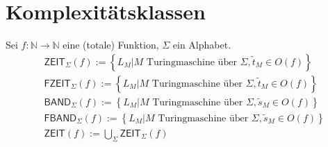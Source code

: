 \documentclass[10pt,oneside,a4paper]{scrartcl}
\begin{document}
\section{Komplexitätsklassen}
    Sei $f : \mathbb{N}\longrightarrow\mathbb{N}$ eine (totale) Funktion,
    $\Sigma$ ein Alphabet.
    \begin{align}
    &\textsf{ZEIT}_{\Sigma}(f) := \left\{
        L_M | M \text{ Turingmaschine über }
        \Sigma, \tilde{t}_M \in O(f)\right\}\\
    &\textsf{FZEIT}_{\Sigma}(f) := \left\{
        L_M | M \text{ Turingmaschine über }
        \Sigma, \tilde{t}_M \in O(f)\right\}\\
    &\textsf{BAND}_{\Sigma}(f) := \left\{
        L_M | M \text{ Turingmaschine über }
        \Sigma, \tilde{s}_M \in O(f)\right\}\\
    &\textsf{FBAND}_{\Sigma}(f) := \left\{
        L_M | M \text{ Turingmaschine über }
        \Sigma, \tilde{s}_M \in O(f)\right\}\\
    &\textsf{ZEIT}(f) := \bigcup_{\Sigma}{\textsf{ZEIT}_{\Sigma}(f)}
    \end{align}
\end{document}
